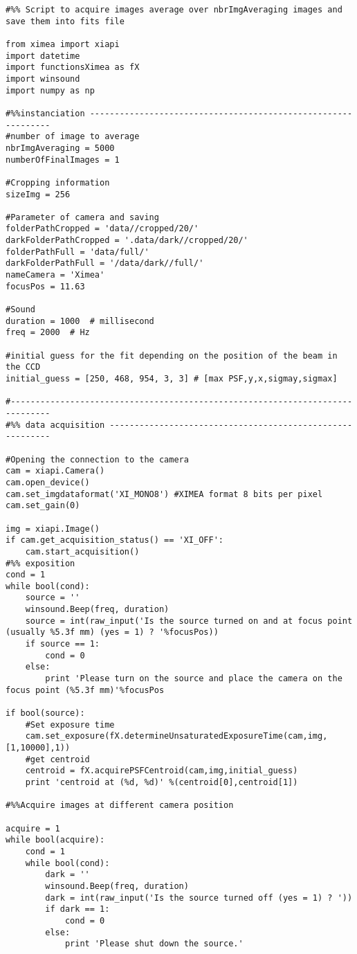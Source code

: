 \begin{lstlisting}
#%% Script to acquire images average over nbrImgAveraging images and save them into fits file

from ximea import xiapi
import datetime
import functionsXimea as fX
import winsound
import numpy as np

#%%instanciation --------------------------------------------------------------
#number of image to average
nbrImgAveraging = 5000
numberOfFinalImages = 1

#Cropping information
sizeImg = 256

#Parameter of camera and saving
folderPathCropped = 'data//cropped/20/'
darkFolderPathCropped = '.data/dark//cropped/20/'
folderPathFull = 'data/full/'
darkFolderPathFull = '/data/dark//full/'
nameCamera = 'Ximea'
focusPos = 11.63

#Sound
duration = 1000  # millisecond
freq = 2000  # Hz

#initial guess for the fit depending on the position of the beam in the CCD
initial_guess = [250, 468, 954, 3, 3] # [max PSF,y,x,sigmay,sigmax]

#------------------------------------------------------------------------------
#%% data acquisition ----------------------------------------------------------

#Opening the connection to the camera
cam = xiapi.Camera()
cam.open_device()
cam.set_imgdataformat('XI_MONO8') #XIMEA format 8 bits per pixel
cam.set_gain(0)

img = xiapi.Image()
if cam.get_acquisition_status() == 'XI_OFF':
    cam.start_acquisition()
#%% exposition
cond = 1
while bool(cond):
    source = ''
    winsound.Beep(freq, duration)
    source = int(raw_input('Is the source turned on and at focus point (usually %5.3f mm) (yes = 1) ? '%focusPos))
    if source == 1:
        cond = 0
    else:
        print 'Please turn on the source and place the camera on the focus point (%5.3f mm)'%focusPos

if bool(source):
    #Set exposure time
    cam.set_exposure(fX.determineUnsaturatedExposureTime(cam,img,[1,10000],1))
    #get centroid
    centroid = fX.acquirePSFCentroid(cam,img,initial_guess)
    print 'centroid at (%d, %d)' %(centroid[0],centroid[1])

#%%Acquire images at different camera position

acquire = 1
while bool(acquire):
    cond = 1
    while bool(cond):
        dark = ''
        winsound.Beep(freq, duration)
        dark = int(raw_input('Is the source turned off (yes = 1) ? '))
        if dark == 1:
            cond = 0
        else:
            print 'Please shut down the source.'


\end{lstlisting}

